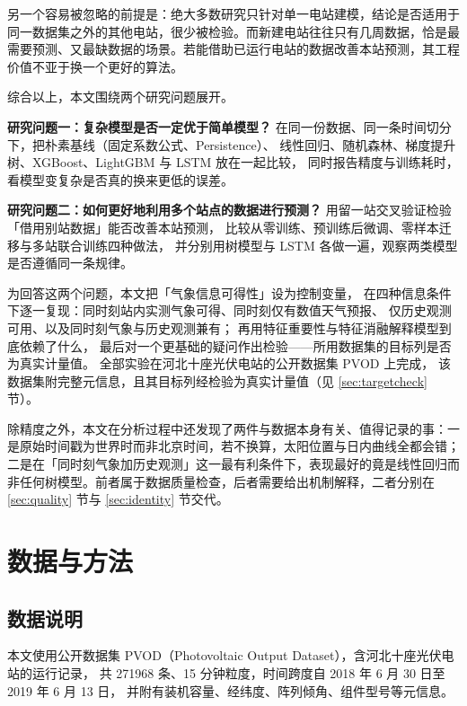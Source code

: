 \documentclass[11pt,a4paper]{ctexart}
\begin{document}
另一个容易被忽略的前提是：绝大多数研究只针对单一电站建模，结论是否适用于同一数据集之外的其他电站，很少被检验。而新建电站往往只有几周数据，恰是最需要预测、又最缺数据的场景。若能借助已运行电站的数据改善本站预测，其工程价值不亚于换一个更好的算法。

综合以上，本文围绕两个研究问题展开。

\textbf{研究问题一：复杂模型是否一定优于简单模型？}
在同一份数据、同一条时间切分下，把朴素基线（固定系数公式、Persistence）、
线性回归、随机森林、梯度提升树、XGBoost、LightGBM 与 LSTM 放在一起比较，
同时报告精度与训练耗时，看模型变复杂是否真的换来更低的误差。

\textbf{研究问题二：如何更好地利用多个站点的数据进行预测？}
用留一站交叉验证检验「借用别站数据」能否改善本站预测，
比较从零训练、预训练后微调、零样本迁移与多站联合训练四种做法，
并分别用树模型与 LSTM 各做一遍，观察两类模型是否遵循同一条规律。

为回答这两个问题，本文把「气象信息可得性」设为控制变量，
在四种信息条件下逐一复现：同时刻站内实测气象可得、同时刻仅有数值天气预报、
仅历史观测可用、以及同时刻气象与历史观测兼有；
再用特征重要性与特征消融解释模型到底依赖了什么，
最后对一个更基础的疑问作出检验——所用数据集的目标列是否为真实计量值。
全部实验在河北十座光伏电站的公开数据集 PVOD 上完成，
该数据集附完整元信息，且其目标列经检验为真实计量值（见 \ref{sec:targetcheck} 节）。

除精度之外，本文在分析过程中还发现了两件与数据本身有关、值得记录的事：一是原始时间戳为世界时而非北京时间，若不换算，太阳位置与日内曲线全都会错；二是在「同时刻气象加历史观测」这一最有利条件下，表现最好的竟是线性回归而非任何树模型。前者属于数据质量检查，后者需要给出机制解释，二者分别在 \ref{sec:quality} 节与 \ref{sec:identity} 节交代。

\section{数据与方法}
\subsection{数据说明}
\label{sec:data}

本文使用公开数据集 PVOD（Photovoltaic Output Dataset），含河北十座光伏电站的运行记录，
共 271968 条、15 分钟粒度，时间跨度自 2018 年 6 月 30 日至 2019 年 6 月 13 日，
并附有装机容量、经纬度、阵列倾角、组件型号等元信息\cite{yao2021photovoltaic,pvod}。
\end{document}
